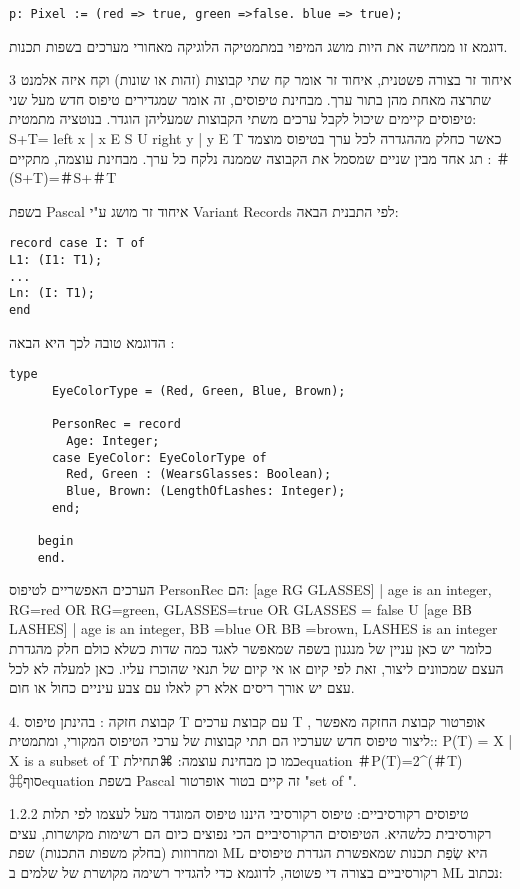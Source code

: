 \begin{verbatim}
p: Pixel := (red => true, green =>false. blue => true);
\end{verbatim}

      דוגמא זו ממחישה את היות מושג המיפוי במתמטיקה הלוגיקה מאחורי מערכים בשפות תכנות.

      3 איחוד זר
      בצורה פשטנית, איחוד זר אומר קח שתי קבוצות (זהות או שונות) וקח איזה אלמנט שתרצה מאחת מהן בתור ערך. מבחינת טיפוסים, זה אומר שמגדירים טיפוס חדש מעל שני טיפוסים קיימים שיכול לקבל ערכים משתי הקבוצות שמעליהן הוגדר. בנוטציה מתמטית:
      S+T= {left x | x E S } U {right y | y E T}
      כאשר כחלק מההגדרה לכל ערך בטיפוס מוצמד תג אחד מבין שניים שמסמל את הקבוצה שממנה נלקח כל ערך.
      מבחינת עוצמה, מתקיים :
      ＃(S+T)=＃S+＃T

      בשפת Pascal איחוד זר מושג ע"י Variant Records לפי התבנית הבאה:
\begin{verbatim}
record case I: T of
L1: (I1: T1);
...
Ln: (I: T1);
end
\end{verbatim}

      הדוגמא טובה לכך היא הבאה :

\begin{verbatim}
type
      EyeColorType = (Red, Green, Blue, Brown);

      PersonRec = record
        Age: Integer;
      case EyeColor: EyeColorType of
        Red, Green : (WearsGlasses: Boolean);
        Blue, Brown: (LengthOfLashes: Integer);
      end;

    begin
    end.
\end{verbatim}

      הערכים האפשריים לטיפוס PersonRec הם:
      { [age RG GLASSES] | age is an integer, RG=red OR RG=green, GLASSES=true OR GLASSES = false} U { [age BB LASHES] | age is an integer, BB =blue OR BB =brown, LASHES is an integer}
      כלומר יש כאן עניין של מנגנון בשפה שמאפשר לאגד כמה שדות כשלא כולם חלק מהגדרת העצם שמכוונים ליצור, זאת לפי קיום או אי קיום של תנאי שהוכרז עליו. כאן למעלה לא לכל עצם יש אורך ריסים אלא רק לאלו עם צבע עיניים כחול או חום.

      4. קבוצת חזקה :
      בהינתן טיפוס T עם קבוצת ערכים T , אופרטור קבוצת החזקה מאפשר ליצור טיפוס חדש שערכיו הם תתי קבוצות של ערכי הטיפוס המקורי, ומתמטית::
      P(T) = {X | X is a subset of T}
      כמו כן מבחינת עוצמה:
      ⌘תחילת{equation}
        ＃P(T)=2^(＃T)
      ⌘סוף{equation}
      בשפת Pascal זה קיים בטור אופרטור "set of ".

      1.2.2 טיפוסים רקורסיביים:
      טיפוס רקורסיבי היננו טיפוס המוגדר מעל לעצמו לפי תלות רקורסיבית כלשהיא.
      הטיפוסים הרקורסיביים הכי נפוצים כיום הם רשימות מקושרות, עצים ומחרוזות (בחלק משפות התכנות)
      שפת ML היא שְׂפַת תכנות שמאפשרת הגדרת טיפוסים רקורסיביים בצורה די פשוטה, לדוגמא כדי להגדיר רשימה מקושרת של שלמים ב ML נכתוב:

